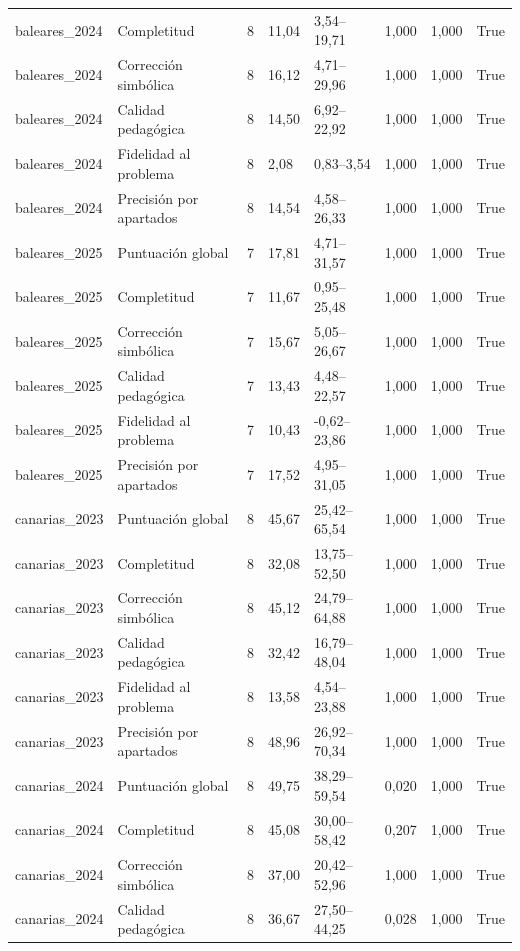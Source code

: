 \begin{tabular}{llrllllr}
baleares\_2024 & Completitud & 8 & 11,04 & 3,54–19,71 & 1,000 & 1,000 & True \\
baleares\_2024 & Corrección simbólica & 8 & 16,12 & 4,71–29,96 & 1,000 & 1,000 & True \\
baleares\_2024 & Calidad pedagógica & 8 & 14,50 & 6,92–22,92 & 1,000 & 1,000 & True \\
baleares\_2024 & Fidelidad al problema & 8 & 2,08 & 0,83–3,54 & 1,000 & 1,000 & True \\
baleares\_2024 & Precisión por apartados & 8 & 14,54 & 4,58–26,33 & 1,000 & 1,000 & True \\
baleares\_2025 & Puntuación global & 7 & 17,81 & 4,71–31,57 & 1,000 & 1,000 & True \\
baleares\_2025 & Completitud & 7 & 11,67 & 0,95–25,48 & 1,000 & 1,000 & True \\
baleares\_2025 & Corrección simbólica & 7 & 15,67 & 5,05–26,67 & 1,000 & 1,000 & True \\
baleares\_2025 & Calidad pedagógica & 7 & 13,43 & 4,48–22,57 & 1,000 & 1,000 & True \\
baleares\_2025 & Fidelidad al problema & 7 & 10,43 & -0,62–23,86 & 1,000 & 1,000 & True \\
baleares\_2025 & Precisión por apartados & 7 & 17,52 & 4,95–31,05 & 1,000 & 1,000 & True \\
canarias\_2023 & Puntuación global & 8 & 45,67 & 25,42–65,54 & 1,000 & 1,000 & True \\
canarias\_2023 & Completitud & 8 & 32,08 & 13,75–52,50 & 1,000 & 1,000 & True \\
canarias\_2023 & Corrección simbólica & 8 & 45,12 & 24,79–64,88 & 1,000 & 1,000 & True \\
canarias\_2023 & Calidad pedagógica & 8 & 32,42 & 16,79–48,04 & 1,000 & 1,000 & True \\
canarias\_2023 & Fidelidad al problema & 8 & 13,58 & 4,54–23,88 & 1,000 & 1,000 & True \\
canarias\_2023 & Precisión por apartados & 8 & 48,96 & 26,92–70,34 & 1,000 & 1,000 & True \\
canarias\_2024 & Puntuación global & 8 & 49,75 & 38,29–59,54 & 0,020 & 1,000 & True \\
canarias\_2024 & Completitud & 8 & 45,08 & 30,00–58,42 & 0,207 & 1,000 & True \\
canarias\_2024 & Corrección simbólica & 8 & 37,00 & 20,42–52,96 & 1,000 & 1,000 & True \\
canarias\_2024 & Calidad pedagógica & 8 & 36,67 & 27,50–44,25 & 0,028 & 1,000 & True \\

\end{tabular}
